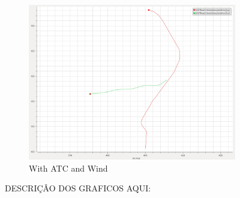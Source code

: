 \begin{figure}[H]
            \begin{subfigure}[b]{0.45\textwidth}
                \centering
                \includegraphics[width=\textwidth]{figs/plot_crossingRight_Wind_E.png}
                \caption{With \ac{ATC} and Wind}
                \label{fig:plot_crossingRight_Wind_E}
            \end{subfigure}
        
        \caption{DESCRIÇÂO DOS GRAFICOS AQUI: }
        \label{fig:crossingRight_E}
        \end{figure}
        
